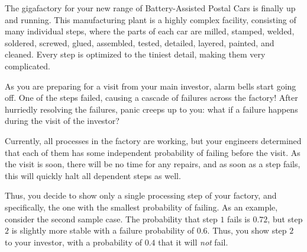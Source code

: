 




The gigafactory for your new range of Battery-Assisted Postal Cars is finally up and running.
This manufacturing plant is a highly complex facility, consisting of many individual steps,
where the parts of each car are
milled, stamped, welded, soldered, screwed, glued, assembled, tested, detailed, layered, painted, and cleaned.
Every step is optimized to the tiniest detail, making them very complicated.

As you are preparing for a visit from your main investor,
alarm bells start going off.
One of the steps failed, causing a cascade of failures across the factory!
After hurriedly resolving the failures, panic creeps up to you:
what if a failure happens during the visit of the investor?


Currently, all processes in the factory are working, but your engineers determined that each
of them has some independent probability of failing before the visit.
As the visit is soon, there will be no time for any repairs, and
as soon as a step fails, this will quickly halt all dependent steps as well.

Thus, you decide to show only a single processing step of your factory,
and specifically, the one with the smallest probability of failing.
As an example, consider the second sample case.
The probability that step $1$ fails is $0.72$,
but step $2$ is slightly more stable with a failure probability of $0.6$.
Thus, you show step $2$ to your investor, with a probability of $0.4$ that it will \emph{not} fail.


